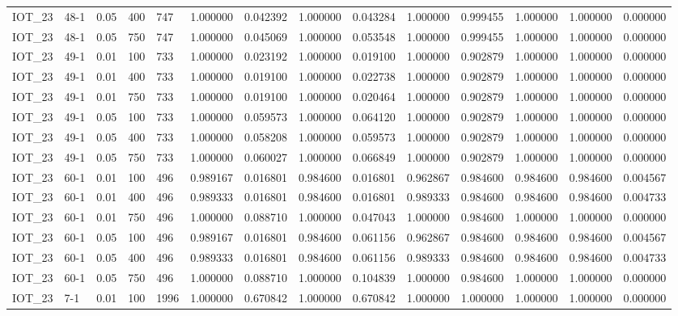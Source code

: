\begin{tabular}{llllllllllllll}
IOT\_23 & 48-1 & 0.05 & 400 & 747 & 1.000000 & 0.042392 & 1.000000 & 0.043284 & 1.000000 & 0.999455 & 1.000000 & 1.000000 & 0.000000 \\
IOT\_23 & 48-1 & 0.05 & 750 & 747 & 1.000000 & 0.045069 & 1.000000 & 0.053548 & 1.000000 & 0.999455 & 1.000000 & 1.000000 & 0.000000 \\
IOT\_23 & 49-1 & 0.01 & 100 & 733 & 1.000000 & 0.023192 & 1.000000 & 0.019100 & 1.000000 & 0.902879 & 1.000000 & 1.000000 & 0.000000 \\
IOT\_23 & 49-1 & 0.01 & 400 & 733 & 1.000000 & 0.019100 & 1.000000 & 0.022738 & 1.000000 & 0.902879 & 1.000000 & 1.000000 & 0.000000 \\
IOT\_23 & 49-1 & 0.01 & 750 & 733 & 1.000000 & 0.019100 & 1.000000 & 0.020464 & 1.000000 & 0.902879 & 1.000000 & 1.000000 & 0.000000 \\
IOT\_23 & 49-1 & 0.05 & 100 & 733 & 1.000000 & 0.059573 & 1.000000 & 0.064120 & 1.000000 & 0.902879 & 1.000000 & 1.000000 & 0.000000 \\
IOT\_23 & 49-1 & 0.05 & 400 & 733 & 1.000000 & 0.058208 & 1.000000 & 0.059573 & 1.000000 & 0.902879 & 1.000000 & 1.000000 & 0.000000 \\
IOT\_23 & 49-1 & 0.05 & 750 & 733 & 1.000000 & 0.060027 & 1.000000 & 0.066849 & 1.000000 & 0.902879 & 1.000000 & 1.000000 & 0.000000 \\
IOT\_23 & 60-1 & 0.01 & 100 & 496 & 0.989167 & 0.016801 & 0.984600 & 0.016801 & 0.962867 & 0.984600 & 0.984600 & 0.984600 & 0.004567 \\
IOT\_23 & 60-1 & 0.01 & 400 & 496 & 0.989333 & 0.016801 & 0.984600 & 0.016801 & 0.989333 & 0.984600 & 0.984600 & 0.984600 & 0.004733 \\
IOT\_23 & 60-1 & 0.01 & 750 & 496 & 1.000000 & 0.088710 & 1.000000 & 0.047043 & 1.000000 & 0.984600 & 1.000000 & 1.000000 & 0.000000 \\
IOT\_23 & 60-1 & 0.05 & 100 & 496 & 0.989167 & 0.016801 & 0.984600 & 0.061156 & 0.962867 & 0.984600 & 0.984600 & 0.984600 & 0.004567 \\
IOT\_23 & 60-1 & 0.05 & 400 & 496 & 0.989333 & 0.016801 & 0.984600 & 0.061156 & 0.989333 & 0.984600 & 0.984600 & 0.984600 & 0.004733 \\
IOT\_23 & 60-1 & 0.05 & 750 & 496 & 1.000000 & 0.088710 & 1.000000 & 0.104839 & 1.000000 & 0.984600 & 1.000000 & 1.000000 & 0.000000 \\
IOT\_23 & 7-1 & 0.01 & 100 & 1996 & 1.000000 & 0.670842 & 1.000000 & 0.670842 & 1.000000 & 1.000000 & 1.000000 & 1.000000 & 0.000000 \\

\end{tabular}
